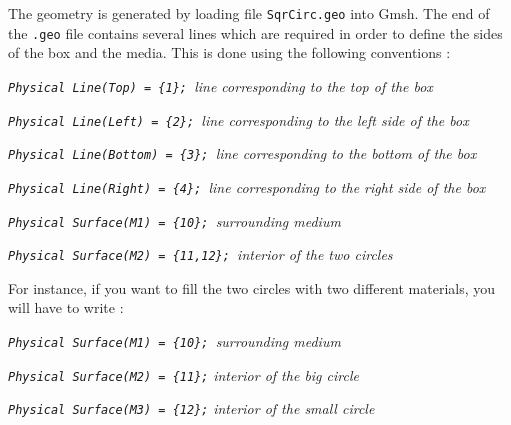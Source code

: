 \documentclass[oneside,english,onecolumn,letterpaper]{book}
\begin{document}
The geometry is generated by loading file \texttt{SqrCirc.geo} into
Gmsh. The end of the \texttt{.geo} file contains several lines which
are required in order to define the sides of the box and the media.
This is done using the following conventions :

\medskip{}


\texttt{\textit{Physical Line(\textquotedbl{}Top\textquotedbl{}) =
\{1\}; }}{\textsf{\textit{\small line corresponding
to the top of the box}}}{\small \par}

\texttt{\textit{Physical Line(\textquotedbl{}Left\textquotedbl{})
= \{2\}; }}{\textsf{\textit{\small line
corresponding to the left side of the box}}}{\small \par}

\texttt{\textit{Physical Line(\textquotedbl{}Bottom\textquotedbl{})
= \{3\}; }}{\textsf{\textit{\small line
corresponding to the bottom of the box}}}{\small \par}

\texttt{\textit{Physical Line(\textquotedbl{}Right\textquotedbl{})
= \{4\}; }}{\textsf{\textit{\small line
corresponding to the right side of the box}}}{\small \par}

\texttt{\textit{Physical Surface(\textquotedbl{}M1\textquotedbl{})
= \{10\}; }}{\textsf{\textit{\small surrounding
medium}}}{\small \par}

\texttt{\textit{Physical Surface(\textquotedbl{}M2\textquotedbl{})
= \{11,12\}; }}{\textsf{\textit{\small interior
of the two circles}}}{\small \par}

\medskip{}


For instance, if you want to fill the two circles with two different
materials, you will have to write :

\medskip{}


\texttt{\textit{Physical Surface(\textquotedbl{}M1\textquotedbl{})
= \{10\}; }}{\textsf{\textit{\small surrounding
medium}}}{\small \par}

\texttt{\textit{Physical Surface(\textquotedbl{}M2\textquotedbl{})
= \{11\};}}{\textsf{\textit{\small{} interior
of the big circle}}}{\small \par}

\texttt{\textit{Physical Surface(\textquotedbl{}M3\textquotedbl{})
= \{12\};}}{\textsf{\textit{\small{} interior
of the small circle}}}{\small \par}
\end{document}
